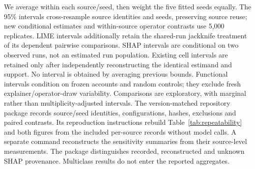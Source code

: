 We average within each source/seed, then weight the five fitted seeds equally.
The 95\% intervals cross-resample source identities and seeds, preserving
source reuse; new conditional estimates and within-source operator contrasts
use 5,000 replicates. LIME intervals additionally retain the shared-run
jackknife treatment of its dependent pairwise comparisons. SHAP intervals
are conditional on two observed runs, not an estimated run population.
Existing cell intervals are retained only after independently reconstructing
the identical estimand and support. No interval is obtained by averaging
previous bounds. Functional intervals condition on frozen accounts and random
controls; they exclude fresh explainer/operator-draw variability. Comparisons
are exploratory, with marginal rather than multiplicity-adjusted intervals.
The version-matched repository package records source/seed identities,
configurations, hashes, exclusions and paired contrasts. Its reproduction
instructions rebuild Table~\ref{tab:repeatability} and both figures from the
included per-source records without model calls. A separate command
reconstructs the sensitivity summaries from their source-level measurements.
The package distinguishes recorded, reconstructed and unknown SHAP provenance.
Multiclass results do not enter the reported aggregates.
